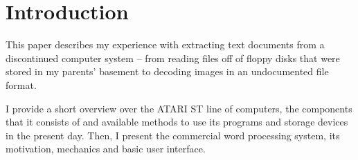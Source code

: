 \begin{abstract}
    In the 1980s, when personal computers with graphical user interfaces
    began to become common in homes and universities, there was an increasing demand to use computers to help with document preparation.
    
    Sometimes referred to as the \textit{\acrfull{dtp} revolution}, this decade saw the invention of \acrshort{dtp} technology that set the foundation for the tools we use today. This includes the initial releases of WordStar (1978), Microsoft Word (1983), PostScript (1984), \TeX{} (1986), and PDF (1993).
    
    This paper describes one of the tools of the time. The \gls{Signum!2} word processing system was a common tool used to write theses and papers in Germany in the 1980s. It was only available on the ATARI ST line of personal computers, created by mathematician Franz Schmerbeck and published by \acrfull{ash}.
    
    \Signum{} was never released for newer operating systems after the ATARI ST was discontinued. The documents that were prepared with it are not compatible with modern software and conversions to other formats are rare and incomplete. In this paper, I also present the results of my personal research into these files, the approach that I took and what I learned about the way \Signum{} works.
\end{abstract}

\tableofcontents

\section*{Introduction}
\label{sec:intro}


This paper describes my experience with extracting text documents from a discontinued computer system – from reading files off of floppy disks that were stored in my parents' basement to decoding images in an undocumented file format.

I provide a short overview over the ATARI ST line of computers, the components that it consists of and available methods to use its programs and storage devices in the present day. Then, I present the commercial \Signum{} word processing system, its motivation, mechanics and basic user interface.

